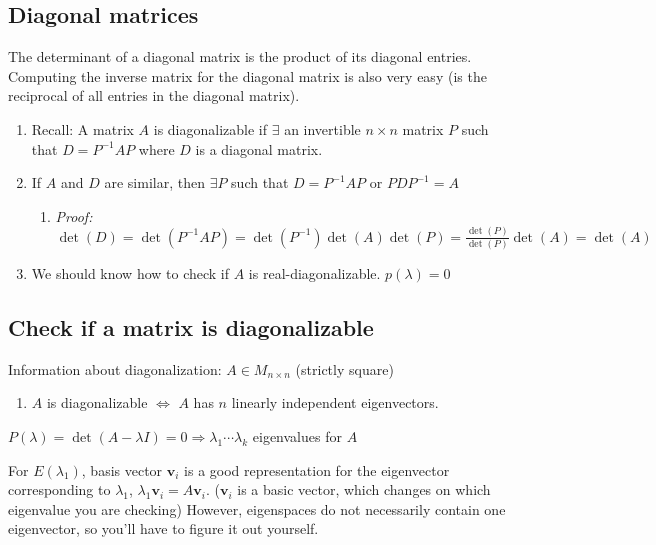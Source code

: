 \documentclass[
]{article}
\begin{document}
\subsection{Diagonal matrices}

The determinant of a diagonal matrix is the product of its diagonal
entries. Computing the inverse matrix for the diagonal matrix is also
very easy (is the reciprocal of all entries in the diagonal matrix).

\begin{enumerate}
\def\labelenumi{\arabic{enumi}.}
\item
  Recall: A matrix $A$ is diagonalizable if $\exists$ an invertible
  $n \times n$ matrix $P$ such that $D = P^{- 1}AP$ where
  $D$ is a diagonal matrix.
\item
  If $A$ and $D$ are similar, then $\exists P$ such that
  $D = P^{- 1}AP$ or $PDP^{- 1} = A$

  \begin{enumerate}
  \def\labelenumii{\alph{enumii}.}
  \item
    \emph{Proof:}
    $\det(D) = \det\left( P^{- 1}AP \right) = \det\left( P^{- 1} \right)\det(A)\det(P) = \frac{\det(P)}{\det(P)}\det(A) = \det(A)$
  \end{enumerate}
\item
  We should know how to check if $A$ is real-diagonalizable.
  $p(\lambda) = 0$
\end{enumerate}


\subsection{Check if a matrix is
diagonalizable}

Information about diagonalization: $A \in M_{n \times n}$ (strictly
square)

\begin{enumerate}
\def\labelenumi{\arabic{enumi}.}
\item
  $A$ is diagonalizable $\Leftrightarrow$ $A$ has $n$ linearly
  independent eigenvectors.
\end{enumerate}

$P(\lambda) = \det(A - \lambda I) = 0 \Rightarrow \lambda_{1}\cdots\lambda_{k}$
eigenvalues for $A$

For $E\left( \lambda_{1} \right)$, basis vector
${\mathbf{v}}_{i}$ is a good representation for the eigenvector
corresponding to $\lambda_{1}$,
$\lambda_{1}{\mathbf{v}}_{i} = A{\mathbf{v}}_{i}$.
(${\mathbf{v}}_{i}$ is a basic vector, which changes on which
eigenvalue you are checking) However, eigenspaces do not necessarily
contain one eigenvector, so you'll have to figure it out yourself.
\end{document}
